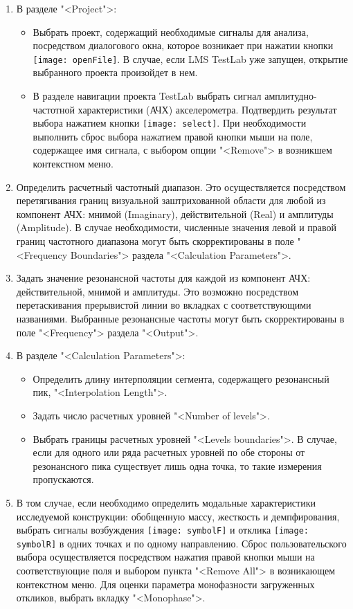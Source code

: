 \begin{enumerate}[topsep=0pt, noitemsep]
	\item В разделе "<Project">:
		\begin{itemize}[topsep=0pt, noitemsep]
			\item Выбрать проект, содержащий необходимые сигналы для анализа, посредством диалогового окна, которое возникает при нажатии кнопки \texttt{[image: openFile]}. В случае, если LMS TestLab уже запущен, открытие выбранного проекта произойдет в нем.
			\item В разделе навигации проекта TestLab выбрать сигнал амплитудно-частотной характеристики (АЧХ) акселерометра. Подтвердить результат выбора нажатием кнопки \texttt{[image: select]}. При необходимости выполнить сброс выбора нажатием правой кнопки мыши на поле, содержащее имя сигнала, с выбором опции "<Remove"> в возникшем контекстном меню.
		\end{itemize}
	\item Определить расчетный частотный диапазон. Это осуществляется посредством перетягивания границ визуальной заштрихованной области для любой из компонент АЧХ: мнимой (Imaginary), действительной (Real) и амплитуды (Amplitude). В случае необходимости, численные значения левой и правой границ частотного диапазона могут быть скорректированы в поле "<Frequency Boundaries"> раздела "<Calculation Parameters">.
	\item Задать значение резонансной частоты для каждой из компонент АЧХ: действительной, мнимой и амплитуды. Это возможно посредством перетаскивания прерывистой линии во вкладках с соответствующими названиями. Выбранные резонансные частоты могут быть скорректированы в поле "<Frequency"> раздела "<Output">.
	\item В разделе "<Calculation Parameters">:
		\begin{itemize}[topsep=0pt, noitemsep]
			\item Определить длину интерполяции сегмента, содержащего резонансный пик, "<Interpolation Length">.
			\item Задать число расчетных уровней "<Number of levels">.
			\item Выбрать границы расчетных уровней "<Levels boundaries">. В случае, если для одного или ряда расчетных уровней по обе стороны от резонансного пика существует лишь одна точка, то такие измерения пропускаются.
		\end{itemize}
	\item В том случае, если необходимо определить модальные характеристики исследуемой конструкции: обобщенную массу, жесткость и демпфирования, выбрать сигналы возбуждения \texttt{[image: symbolF]} и отклика \texttt{[image: symbolR]} в одних точках и по одному направлению. Сброс пользовательского выбора осуществляется посредством нажатия правой кнопки мыши на соответствующие поля и выбором пункта "<Remove All"> в возникающем контекстном меню. Для оценки параметра монофазности загруженных откликов, выбрать вкладку "<Monophase">.
\end{enumerate}

